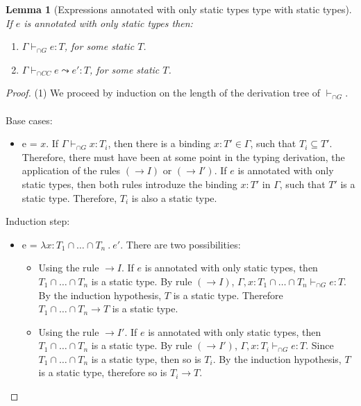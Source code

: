 \documentclass[a4paper]{article}
\newtheorem{lemma}{Lemma}
\begin{document}
\begin{lemma}[Expressions annotated with only static types type with static types]
\label{staticexpressionstypestatic}
If $e$ is annotated with only static types then:
\begin{enumerate}
    \item $\Gamma \vdash_{\cap G} e : T$, for some static $T$.
    \item $\Gamma \vdash_{\cap CC} e \leadsto e' : T$, for some static $T$.
\end{enumerate}
\end{lemma}
\begin{proof}
(1) We proceed by induction on the length of the derivation tree of $\vdash_{\cap G}$.\\\\
Base cases:
\begin{itemize}
    \item e = $x$.
    If $\Gamma \vdash_{\cap G} x : T_i$, then there is a binding $x : T' \in \Gamma$, such that $T_i \subseteq T'$.
    Therefore, there must have been at some point in the typing derivation, the application of the rules $({\rightarrow} I)$ or $({\rightarrow} I')$. If $e$ is annotated with only static types, then both rules introduze the binding $x : T'$ in $\Gamma$, such that $T'$ is a static type. Therefore, $T_i$ is also a static type.
\end{itemize}
Induction step:
\begin{itemize}
    \item e = $\lambda x : T_1 \cap \ldots \cap T_n\ .\ e'$.
    There are two possibilities:
    \begin{itemize}
        \item Using the rule ${\rightarrow} I$.
        If $e$ is annotated with only static types, then $T_1 \cap \ldots \cap T_n$ is a static type.
        By rule $({\rightarrow} I)$, $\Gamma, x : T_1 \cap \ldots \cap T_n \vdash_{\cap G} e : T$.
        By the induction hypothesis, $T$ is a static type.
        Therefore $T_1 \cap \ldots \cap T_n \rightarrow T$ is a static type.
        \item Using the rule ${\rightarrow} I'$.
        If $e$ is annotated with only static types, then $T_1 \cap \ldots \cap T_n$ is a static type.
        By rule $({\rightarrow} I')$, $\Gamma, x : T_i \vdash_{\cap G} e : T$.
        Since $T_1 \cap \ldots \cap T_n$ is a static type, then so is $T_i$.
        By the induction hypothesis, $T$ is a static type, therefore so is $T_i \rightarrow T$.
    \end{itemize}

\end{itemize}
\end{proof}
\end{document}
